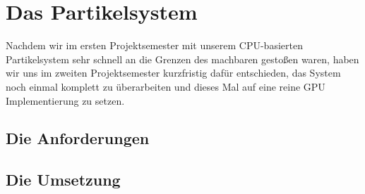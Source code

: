 \section{Das Partikelsystem}
\begin{Spacing}{\mylinespace}

Nachdem wir im ersten Projektsemester mit unserem CPU-basierten Partikelsystem sehr schnell an die Grenzen des machbaren gestoßen waren, haben wir uns im zweiten Projektsemester kurzfristig dafür entschieden, das System noch einmal komplett zu überarbeiten und dieses Mal auf eine reine GPU Implementierung zu setzen.

\subsection{Die Anforderungen}

\subsection{Die Umsetzung}

\end{Spacing}
\newpage
\clearpage
